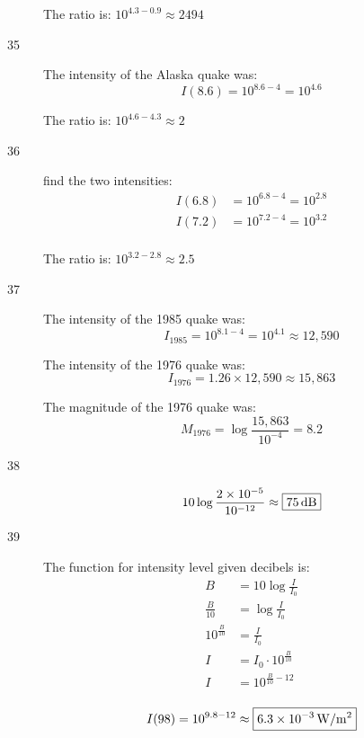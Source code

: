 \documentclass{exam}
\begin{document}
\begin{description}
        The ratio is: $10^{4.3 - 0.9} \approx \boxed{2494}$ 

      \item[35]
        The intensity of the Alaska quake was:
        \[
          I(8.6) = 10^{8.6 - 4} = 10^{4.6}
        \]

        The ratio is: $10^{4.6 - 4.3} \approx \boxed{2}$ 

      \item[36]
        find the two intensities:
        \begin{align*}
          I(6.8) &= 10^{6.8 - 4} = 10^{2.8} \\
          I(7.2) &= 10^{7.2 - 4} = 10^{3.2} \\
        \end{align*}

        The ratio is: $10^{3.2 - 2.8} \approx \boxed{2.5}$ 

      \pagebreak

      \item[37]
        The intensity of the 1985 quake was:
        \[
          I_{1985} = 10^{8.1 - 4} = 10^{4.1} \approx 12,590
        \]

        The intensity of the 1976 quake was: 
        \[
          I_{1976} = 1.26 \times 12,590 \approx 15,863
        \]

        The magnitude of the 1976 quake was:
        \[
          M_{1976} = \log \frac{15,863}{10^{-4}} = \boxed{8.2}
        \]

      \item[38]
        \[
          10 \log \frac{2 \times 10^{-5}}{10^{-12}} \approx \boxed{\unit[75]{dB}} 
        \]

      \item[39]
        The function for intensity level given decibels is:
        \begin{align*}
          B                 & = 10 \log \frac{I}{I_0} \\
          \frac{B}{10}      & = \log \frac{I}{I_0} \\
          10^{\frac{B}{10}} & = \frac{I}{I_0} \\
          I                 & = I_0 \cdot 10^{\frac{B}{10}} \\
          I                 & = 10^{\frac{B}{10} - 12} \\
        \end{align*}

        \[
          I(98) = 10^{9.8 - 12} \approx \boxed{ \unit[6.3 \times 10^{-3}]{W/m^2} }
        \]


\end{description}
\end{document}
